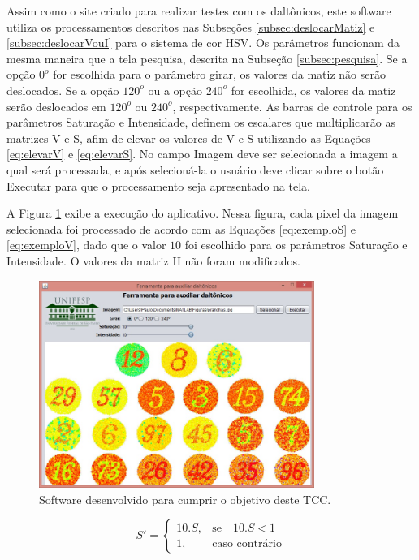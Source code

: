 \documentclass[	12pt, Times, openright, twoside, a4paper, english, brazil]{abntex2}
\begin{document}
Assim como o site criado para realizar testes com os daltônicos, este software utiliza os processamentos descritos nas Subseções \ref{subsec:deslocarMatiz} e \ref{subsec:deslocarVouI} para o sistema de cor HSV. Os parâmetros funcionam da mesma maneira que a tela pesquisa, descrita na Subseção \ref{subsec:pesquisa}. Se a opção $0^o$ for escolhida para o parâmetro girar, os valores da matiz não serão deslocados. Se a opção $120^o$ ou a opção $240^o$ for escolhida, os valores da matiz serão deslocados em $120^o$ ou $240^o$, respectivamente. As barras de controle para os parâmetros Saturação e Intensidade, definem os escalares que multiplicarão as matrizes V e S, afim de elevar os valores de V e S utilizando as Equações \ref{eq:elevarV} e \ref{eq:elevarS}. No campo Imagem deve ser selecionada a imagem a qual será processada, e após selecioná-la o usuário deve clicar sobre o botão Executar para que o processamento seja apresentado na tela.

A Figura \ref{fig:telaFerramenta} exibe a execução do aplicativo. Nessa figura, cada pixel da imagem selecionada foi processado de acordo com as Equações \ref{eq:exemploS} e \ref{eq:exemploV}, dado que o valor $10$ foi escolhido para os parâmetros Saturação e Intensidade. O valores da matriz H não foram modificados.


\begin{figure}[!htb]
\centering \includegraphics[width=0.8\textwidth]{telaFerramenta.jpg}
\caption{Software desenvolvido para cumprir o objetivo deste TCC.} \label{fig:telaFerramenta}
\end{figure}

\begin{equation}
\label{eq:exemploS}
S'=\left\{
\begin{array}{rl}
       10 . S,&\mbox{se}\quad 10 . S < 1 \\
       1,&\mbox{caso contrário}
\end{array}\right.
\end{equation}
\end{document}
